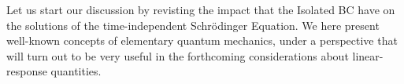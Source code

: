 \documentclass[reprint,aps,prb]{revtex4-1}
\begin{document}
% 



Let us start our discussion by revisting the impact that the Isolated BC have on the 
solutions of the time-independent Schr\"odinger Equation.
We here present well-known concepts of elementary quantum mechanics, under a perspective that
will turn out to be very useful in the forthcoming considerations about linear-response quantities.
\end{document}
